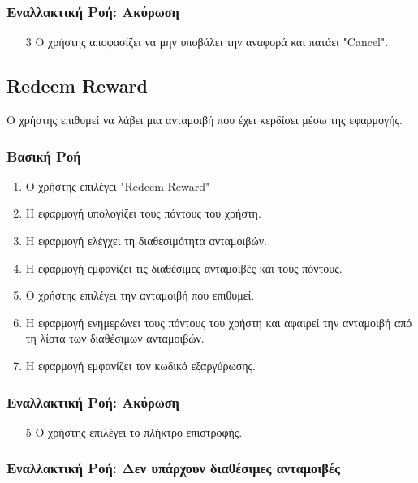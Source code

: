 \subsubsection{Εναλλακτική Ροή: Ακύρωση}

\begin{enumerate}
    \item[3] Ο χρήστης αποφασίζει να μην υποβάλει την αναφορά και πατάει "Cancel".
\end{enumerate}

\newpage

\subsection{Redeem Reward}
\label{uc:redeem-reward}

Ο χρήστης επιθυμεί να λάβει μια ανταμοιβή που έχει κερδίσει μέσω της εφαρμογής.

\subsubsection{Βασική Ροή}

\begin{enumerate}
    \item Ο χρήστης επιλέγει "Redeem Reward"
    \item Η εφαρμογή υπολογίζει τους πόντους του χρήστη.
    \item H εφαρμογή ελέγχει τη διαθεσιμότητα ανταμοιβών.
    \item Η εφαρμογή εμφανίζει τις διαθέσιμες ανταμοιβές και τους πόντους.
    \item Ο χρήστης επιλέγει την ανταμοιβή που επιθυμεί.
    \item Η εφαρμογή ενημερώνει τους πόντους του χρήστη και αφαιρεί την ανταμοιβή
          από τη λίστα των διαθέσιμων ανταμοιβών.
    \item Η εφαρμογή εμφανίζει τον κωδικό εξαργύρωσης.
\end{enumerate}

\subsubsection{Εναλλακτική Ροή: Ακύρωση}

\begin{enumerate}
    \item[5] Ο χρήστης επιλέγει το πλήκτρο επιστροφής.
\end{enumerate}

\subsubsection{Εναλλακτική Ροή: Δεν υπάρχουν διαθέσιμες ανταμοιβές}

